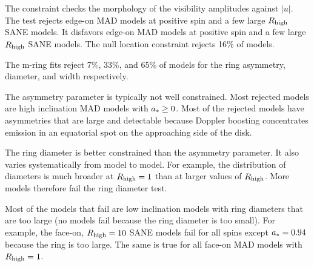 

The \vam constraint checks the morphology of the visibility amplitudes
against $|u|$.
The test rejects edge-on MAD models at positive spin and a few large
$R_\mathrm{high}$ SANE models.
It disfavors edge-on MAD models at positive spin and a few large $R_\mathrm{high}$
SANE models.
The null location constraint rejects 16\% of models.

\label{sec:mring}

The m-ring fits reject 7\%, 33\%, and 65\% of models for the ring asymmetry, diameter, and width respectively.

The asymmetry parameter is typically not well constrained. Most rejected models are high inclination MAD models with $a_* \ge 0$.  Most of the rejected models have asymmetries that are large and detectable because Doppler boosting concentrates emission in an equatorial spot on the approaching side of the disk.


The ring diameter is better constrained than the asymmetry parameter.  It also varies systematically from model to model.  For example, the distribution of diameters is much broader at $R_\mathrm{high} = 1$ than at larger values of $R_\mathrm{high}$.  More models therefore fail the ring diameter test.

Most of the models that fail are low inclination models with ring diameters that are too large (no models fail because the ring diameter is too small).  For example, the face-on, $R_\mathrm{high} = 10$ SANE models fail for all spins except $a_* = 0.94$ because the ring is too large.  The same is true for all face-on MAD models with $R_\mathrm{high} = 1$.

